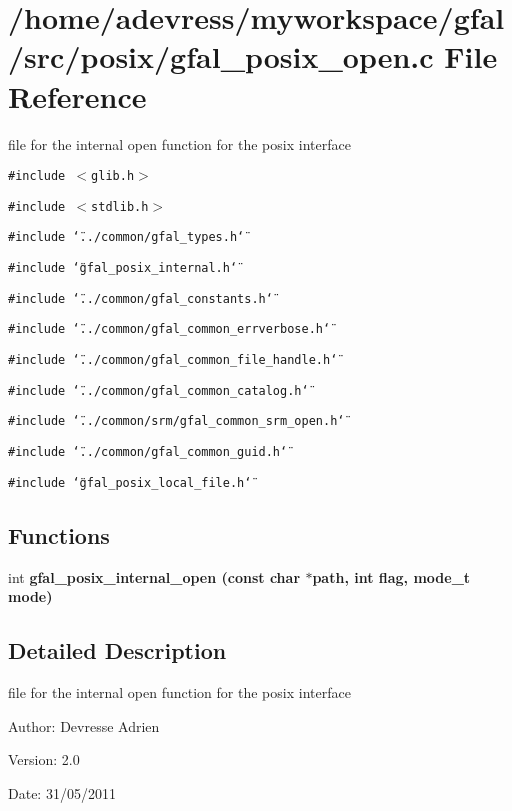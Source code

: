 \section{/home/adevress/myworkspace/gfal/src/posix/gfal\_\-posix\_\-open.c File Reference}
\label{gfal__posix__open_8c}
file for the internal open function for the posix interface 

{\tt \#include $<$glib.h$>$}\par
{\tt \#include $<$stdlib.h$>$}\par
{\tt \#include \char`\"{}../common/gfal\_\-types.h\char`\"{}}\par
{\tt \#include \char`\"{}gfal\_\-posix\_\-internal.h\char`\"{}}\par
{\tt \#include \char`\"{}../common/gfal\_\-constants.h\char`\"{}}\par
{\tt \#include \char`\"{}../common/gfal\_\-common\_\-errverbose.h\char`\"{}}\par
{\tt \#include \char`\"{}../common/gfal\_\-common\_\-file\_\-handle.h\char`\"{}}\par
{\tt \#include \char`\"{}../common/gfal\_\-common\_\-catalog.h\char`\"{}}\par
{\tt \#include \char`\"{}../common/srm/gfal\_\-common\_\-srm\_\-open.h\char`\"{}}\par
{\tt \#include \char`\"{}../common/gfal\_\-common\_\-guid.h\char`\"{}}\par
{\tt \#include \char`\"{}gfal\_\-posix\_\-local\_\-file.h\char`\"{}}\par
\subsection*{Functions}
\begin{CompactItemize}
\item 
int \bf{gfal\_\-posix\_\-internal\_\-open} (const char $\ast$path, int flag, mode\_\-t mode)
\end{CompactItemize}


\subsection{Detailed Description}
file for the internal open function for the posix interface 

\begin{Desc}
\item[Author:]Devresse Adrien \end{Desc}
\begin{Desc}
\item[Version:]2.0 \end{Desc}
\begin{Desc}
\item[Date:]31/05/2011 \end{Desc}


